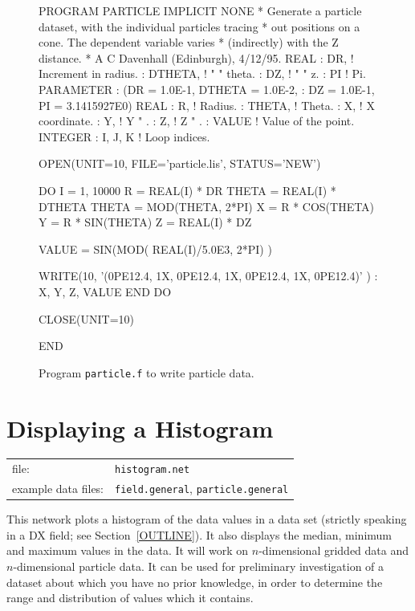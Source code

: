 \documentclass[twoside,11pt]{starlink}
\begin{document}
\begin{figure}[htbp]

\begin{terminalv}
      PROGRAM PARTICLE
      IMPLICIT NONE
*    Generate a particle dataset, with the individual particles tracing
*    out positions on a cone.  The dependent variable varies
*    (indirectly) with the Z distance.
*    A C Davenhall (Edinburgh), 4/12/95.
      REAL
     :  DR,      ! Increment in radius.
     :  DTHETA,  !     "     "  theta.
     :  DZ,      !     "     "  z.
     :  PI       ! Pi.
      PARAMETER
     : (DR = 1.0E-1,  DTHETA = 1.0E-2,
     :  DZ = 1.0E-1,  PI = 3.1415927E0)
      REAL
     :  R,       ! Radius.
     :  THETA,   ! Theta.
     :  X,       ! X coordinate.
     :  Y,       ! Y     "     .
     :  Z,       ! Z     "     .
     :  VALUE    ! Value of the point.
      INTEGER
     :  I, J, K  ! Loop indices.

      OPEN(UNIT=10, FILE='particle.lis', STATUS='NEW')

      DO I = 1, 10000
         R = REAL(I) * DR
         THETA = REAL(I) * DTHETA
         THETA = MOD(THETA, 2*PI)
         X = R * COS(THETA)
         Y = R * SIN(THETA)
         Z = REAL(I) * DZ

         VALUE = SIN(MOD( REAL(I)/5.0E3, 2*PI) )

         WRITE(10, '(0PE12.4, 1X, 0PE12.4, 1X, 0PE12.4, 1X, 0PE12.4)' )
     :     X, Y, Z, VALUE
      END DO

      CLOSE(UNIT=10)

      END
\end{terminalv}

\caption[Program \texttt{particle.f} to write particle data.]{Program \texttt{particle.f} to write particle data. \label{PARTICLE.F} }

\end{figure}


\newpage
\section{\label{HISTNET}Displaying a Histogram}


\begin{tabular}{ll}
file:               & \texttt{histogram.net} \\
example data files: & \texttt{field.general}, \texttt{particle.general} \\
\end{tabular}

This network plots a histogram of the data values in a data set (strictly
speaking in a DX field; see Section~\ref{OUTLINE}). It also displays the
median, minimum and maximum values in the data. It will work on
$n$-dimensional gridded data and $n$-dimensional particle data. It can be
used for preliminary investigation of a dataset about which you have no
prior knowledge, in order to determine the range and distribution of
values which it contains.
\end{document}

